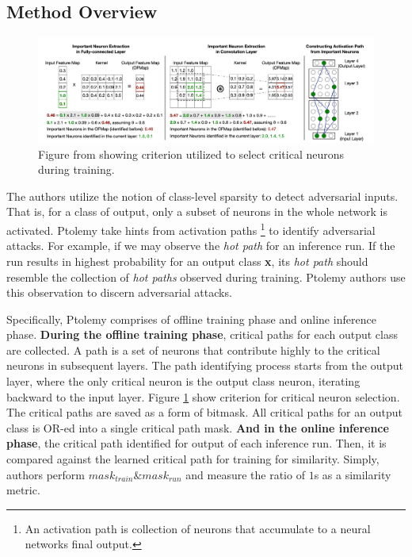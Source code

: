 \documentclass[11pt]{article}
\begin{document}
\subsection{Method Overview\label{sec:overview}}
\begin{figure}[H]
    \begin{center}
    \includegraphics[width=\textwidth]{images/ptolemy.png}
    \end{center}
    \caption{Figure from \cite{ptolemy} showing criterion utilized to select critical neurons during training.}
        \label{fig:criterion}
\end{figure}

The authors utilize the notion of class-level sparsity \cite{identify} to detect adversarial inputs. That is, for a class of output, only a subset of neurons in the whole network is activated. Ptolemy take hints from activation paths \footnote{An activation path is collection of neurons that accumulate to a neural networks final output.} to identify adversarial attacks. For example, if we may observe the \textit{hot path} for an inference run. If the run results in highest probability for an output class \textbf{x}, its \textit{hot path} should resemble the collection of \textit{hot paths} observed during training. Ptolemy authors use this observation to discern adversarial attacks.

Specifically, Ptolemy comprises of offline training phase and online inference phase. \textbf{During the offline training phase}, critical paths for each output class are collected. A path is a set of neurons that contribute highly to the critical neurons in subsequent layers. The path identifying process starts from the output layer, where the only critical neuron is the output class neuron, iterating backward to the input layer. Figure \ref{fig:criterion} show criterion for critical neuron selection. The critical paths are saved as a form of bitmask. All critical paths for an output class is OR-ed into a single critical path mask. \textbf{And in the online inference phase}, the critical path identified for output of each inference run. Then, it is compared against the learned critical path for training for similarity. Simply, authors perform $ mask_{train} \& mask_{run} $ and measure the ratio of $1$s as a similarity metric.
\end{document}

